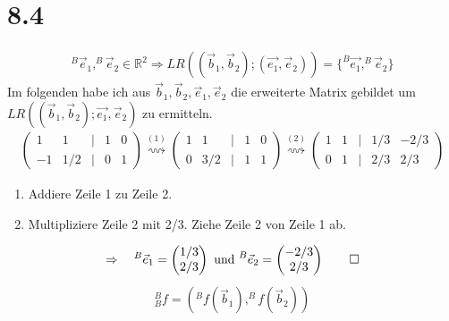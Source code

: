 \documentclass[titlepage]{article}
\newcommand{\R}{\mathbb{R}}
\newcommand{\1}{\mathbb{1}}
\newcommand{\0}{\mathbb{0}}
\begin{document}
	\section*{8.4}
		\begin{align*}
			^B\vec{e}_1,^B\vec{e}_2\in\R^2\Rightarrow LR\left((\vec{b}_1,\vec{b}_2);(\vec{e_1},\vec{e}_2)\right)=\{^B\vec{e_1},^B\vec{e}_2\}
		\end{align*}
		Im folgenden habe ich aus $\vec{b}_1,\vec{b}_2,\vec{e}_1,\vec{e}_2$ die erweiterte Matrix gebildet um $LR\left((\vec{b}_1,\vec{b}_2);\vec{e_1},\vec{e}_2\right)$ zu ermitteln.
		\begin{align*}
			\begin{pmatrix}
				1&1&|&1&0\\
				-1&1/2&|&0&1
			\end{pmatrix}
			\overset{(1)}{\rightsquigarrow}
			\begin{pmatrix}
				1&1&|&1&0\\
				0&3/2&|&1&1
			\end{pmatrix}
			\overset{(2)}{\rightsquigarrow}
			\begin{pmatrix}
				1&1&|&1/3&-2/3\\
				0&1&|&2/3&2/3
			\end{pmatrix}
		\end{align*}
		\begin{enumerate}
			\item Addiere Zeile 1 zu Zeile 2.
			\item Multipliziere Zeile 2 mit 2/3. Ziehe Zeile 2 von Zeile 1 ab.
		\end{enumerate}
		\begin{align*}
			\Rightarrow\quad^B\vec{e}_1=\begin{pmatrix}1/3\\2/3\end{pmatrix}\text{ und }^B\vec{e}_2=\begin{pmatrix}-2/3\\2/3\end{pmatrix}\qed
		\end{align*}
		\begin{align*}
			^B_Bf=\left(^Bf(\vec{b}_1),^Bf(\vec{b}_2)\right)
		\end{align*}
\end{document}
